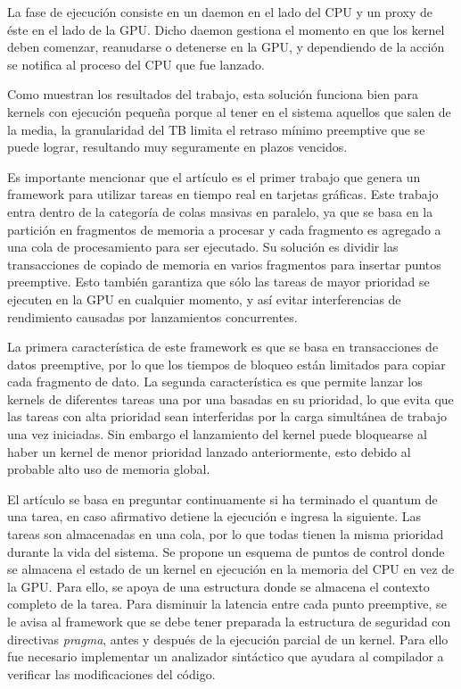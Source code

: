 La fase de ejecución consiste en un daemon en el lado del CPU y un proxy de éste en el lado de la GPU. Dicho daemon gestiona el momento en que los kernel deben comenzar, reanudarse o detenerse en la GPU, y dependiendo de la acción se notifica al proceso del CPU que fue lanzado.

Como muestran los resultados del trabajo, esta solución funciona bien para kernels con ejecución pequeña porque al tener en el sistema aquellos que salen de la media, la granularidad del TB limita el retraso mínimo preemptive que se puede lograr, resultando muy seguramente en plazos vencidos.
 
 Es importante mencionar que el artículo \cite{RGEM} es el primer trabajo que genera un framework para utilizar tareas en tiempo real en tarjetas gráficas. 
 Este trabajo entra dentro de la categoría de colas masivas en paralelo, ya que se basa en la partición en fragmentos de memoria a procesar y cada fragmento es agregado a una cola de procesamiento para ser ejecutado. Su solución es dividir las transacciones de copiado de memoria en varios fragmentos para insertar puntos preemptive. 
 Esto también garantiza que sólo las tareas de mayor prioridad se ejecuten en la GPU en cualquier momento, y así evitar interferencias de rendimiento causadas por lanzamientos concurrentes.

	La primera característica de este framework es que se basa en transacciones de datos preemptive, por lo que los tiempos de bloqueo están limitados para copiar cada fragmento de dato. La segunda característica es que permite lanzar los kernels de diferentes tareas una por una basadas en su prioridad, lo que evita que las tareas con alta prioridad sean interferidas por la carga simultánea de trabajo una vez iniciadas. 
	Sin embargo el lanzamiento del kernel puede bloquearse al haber un kernel de menor prioridad lanzado anteriormente, esto debido al probable alto uso de memoria global.
\newline

El artículo \cite{PreeK} se basa en preguntar continuamente si ha terminado el quantum de una tarea, en caso afirmativo detiene la ejecución e ingresa la siguiente. Las tareas son almacenadas en una cola, por lo que todas tienen la misma prioridad durante la vida del sistema. Se propone un esquema de puntos de control donde se almacena el estado de un kernel en ejecución en la memoria del CPU en vez de la GPU. Para ello, se apoya de una estructura donde se almacena el contexto completo de la tarea. 
Para disminuir la latencia entre cada punto preemptive, se le avisa al framework que se debe tener preparada la estructura de seguridad con directivas \textit{pragma}, antes y después de la ejecución parcial de un kernel. Para ello fue necesario implementar un analizador sintáctico que ayudara al compilador a verificar las modificaciones del código.
\newline


